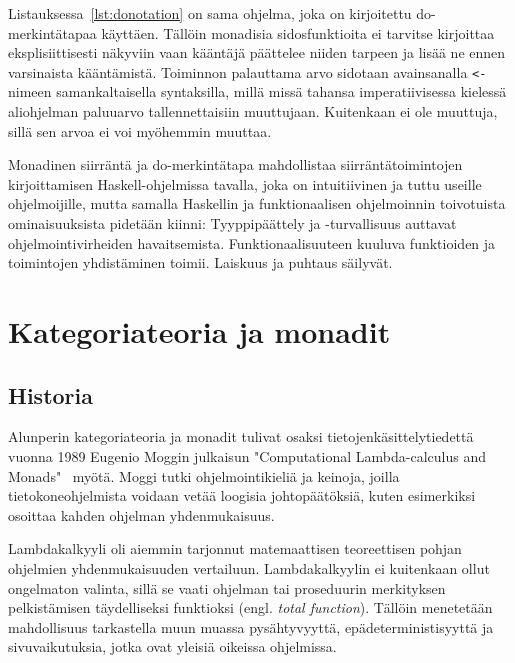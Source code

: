 \documentclass[finnish]{tktltiki2}
\begin{document}
Listauksessa~\ref{lst:donotation} on sama ohjelma, joka on kirjoitettu do-merkintätapaa käyttäen.
Tällöin monadisia sidosfunktioita ei tarvitse kirjoittaa eksplisiittisesti näkyviin vaan kääntäjä
päättelee niiden tarpeen ja lisää ne ennen varsinaista kääntämistä. Toiminnon 
palauttama arvo sidotaan avainsanalla \verb|<-| nimeen samankaltaisella syntaksilla, millä missä
tahansa imperatiivisessa kielessä aliohjelman paluuarvo tallennettaisiin muuttujaan. Kuitenkaan
 ei ole muuttuja, sillä sen arvoa ei voi myöhemmin muuttaa.

Monadinen siirräntä ja do-merkintätapa mahdollistaa siirräntätoimintojen kirjoittamisen
Haskell-ohjelmissa tavalla, joka on intuitiivinen ja tuttu useille ohjelmoijille, mutta samalla
Haskellin ja funktionaalisen ohjelmoinnin toivotuista ominaisuuksista pidetään kiinni:
Tyyppipäättely ja -turvallisuus auttavat ohjelmointivirheiden havaitsemista. Funktionaalisuuteen
kuuluva funktioiden ja toimintojen yhdistäminen toimii. Laiskuus ja puhtaus säilyvät.

\section{Kategoriateoria ja monadit}

\subsection{Historia}

Alunperin kategoriateoria ja monadit tulivat osaksi tietojenkäsittelytiedettä vuonna 1989 Eugenio
Moggin julkaisun "Computational Lambda-calculus and Monads"~\cite{clcam89,nocam91} myötä. Moggi
tutki ohjelmointikieliä ja keinoja, joilla tietokoneohjelmista voidaan vetää loogisia
johtopäätöksiä, kuten esimerkiksi osoittaa kahden ohjelman yhdenmukaisuus.

Lambdakalkyyli oli aiemmin tarjonnut matemaattisen teoreettisen pohjan ohjelmien yhdenmukaisuuden
vertailuun. Lambdakalkyylin ei kuitenkaan ollut ongelmaton valinta, sillä se vaati ohjelman tai
proseduurin merkityksen pelkistämisen täydelliseksi funktioksi (engl. \emph{total function}).
Tällöin menetetään mahdollisuus tarkastella muun muassa pysähtyvyyttä, epädeterministisyyttä ja
sivuvaikutuksia, jotka ovat yleisiä oikeissa ohjelmissa.

%
\end{document}
